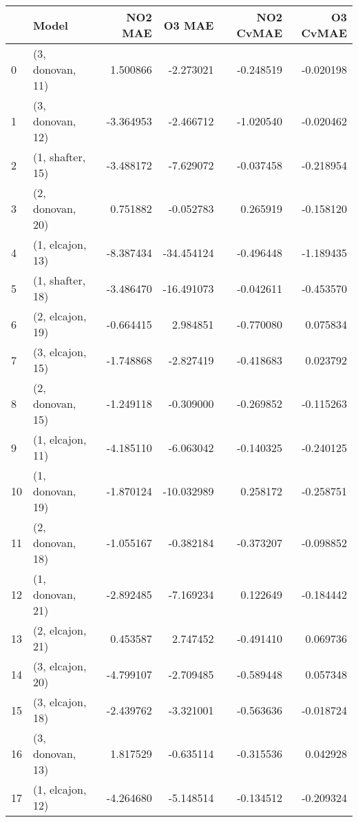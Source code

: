 \begin{tabular}{llrrrr}
\toprule
{} &             Model &   NO2 MAE &     O3 MAE &  NO2 CvMAE &  O3 CvMAE \\
\midrule
0  &  (3, donovan, 11) &  1.500866 &  -2.273021 &  -0.248519 & -0.020198 \\
1  &  (3, donovan, 12) & -3.364953 &  -2.466712 &  -1.020540 & -0.020462 \\
2  &  (1, shafter, 15) & -3.488172 &  -7.629072 &  -0.037458 & -0.218954 \\
3  &  (2, donovan, 20) &  0.751882 &  -0.052783 &   0.265919 & -0.158120 \\
4  &  (1, elcajon, 13) & -8.387434 & -34.454124 &  -0.496448 & -1.189435 \\
5  &  (1, shafter, 18) & -3.486470 & -16.491073 &  -0.042611 & -0.453570 \\
6  &  (2, elcajon, 19) & -0.664415 &   2.984851 &  -0.770080 &  0.075834 \\
7  &  (3, elcajon, 15) & -1.748868 &  -2.827419 &  -0.418683 &  0.023792 \\
8  &  (2, donovan, 15) & -1.249118 &  -0.309000 &  -0.269852 & -0.115263 \\
9  &  (1, elcajon, 11) & -4.185110 &  -6.063042 &  -0.140325 & -0.240125 \\
10 &  (1, donovan, 19) & -1.870124 & -10.032989 &   0.258172 & -0.258751 \\
11 &  (2, donovan, 18) & -1.055167 &  -0.382184 &  -0.373207 & -0.098852 \\
12 &  (1, donovan, 21) & -2.892485 &  -7.169234 &   0.122649 & -0.184442 \\
13 &  (2, elcajon, 21) &  0.453587 &   2.747452 &  -0.491410 &  0.069736 \\
14 &  (3, elcajon, 20) & -4.799107 &  -2.709485 &  -0.589448 &  0.057348 \\
15 &  (3, elcajon, 18) & -2.439762 &  -3.321001 &  -0.563636 & -0.018724 \\
16 &  (3, donovan, 13) &  1.817529 &  -0.635114 &  -0.315536 &  0.042928 \\
17 &  (1, elcajon, 12) & -4.264680 &  -5.148514 &  -0.134512 & -0.209324 \\
\bottomrule
\end{tabular}
